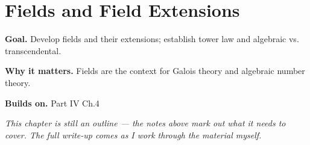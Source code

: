 \chapter{Fields and Field Extensions}
\label{ch:04-abstract-algebra-05}

\begin{chapterintro}
\textbf{Goal.} Develop fields and their extensions; establish tower law and algebraic vs. transcendental.

\textbf{Why it matters.} Fields are the context for Galois theory and algebraic number theory.

\textbf{Builds on.} Part IV Ch.4
\end{chapterintro}

\textit{This chapter is still an outline --- the notes above mark out what it needs to cover. The full write-up comes as I work through the material myself.}
